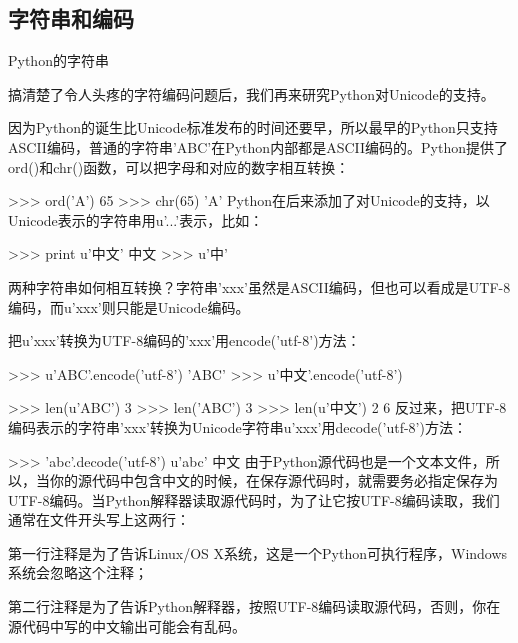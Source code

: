 \documentclass[10pt,a4paper]{ctexbook}
\begin{document}
\subsection{字符串和编码}

Python的字符串

搞清楚了令人头疼的字符编码问题后，我们再来研究Python对Unicode的支持。

因为Python的诞生比Unicode标准发布的时间还要早，所以最早的Python只支持ASCII编码，普通的字符串'ABC'在Python内部都是ASCII编码的。Python提供了ord()和chr()函数，可以把字母和对应的数字相互转换：

>>> ord('A')
65
>>> chr(65)
'A'
Python在后来添加了对Unicode的支持，以Unicode表示的字符串用u'...'表示，比如：

>>> print u'中文'
中文
>>> u'中'

两种字符串如何相互转换？字符串'xxx'虽然是ASCII编码，但也可以看成是UTF-8编码，而u'xxx'则只能是Unicode编码。

把u'xxx'转换为UTF-8编码的'xxx'用encode('utf-8')方法：

>>> u'ABC'.encode('utf-8')
'ABC'
>>> u'中文'.encode('utf-8')

>>> len(u'ABC')
3
>>> len('ABC')
3
>>> len(u'中文')
2
6
反过来，把UTF-8编码表示的字符串'xxx'转换为Unicode字符串u'xxx'用decode('utf-8')方法：

>>> 'abc'.decode('utf-8')
u'abc'
中文
由于Python源代码也是一个文本文件，所以，当你的源代码中包含中文的时候，在保存源代码时，就需要务必指定保存为UTF-8编码。当Python解释器读取源代码时，为了让它按UTF-8编码读取，我们通常在文件开头写上这两行：

第一行注释是为了告诉Linux/OS X系统，这是一个Python可执行程序，Windows系统会忽略这个注释；

第二行注释是为了告诉Python解释器，按照UTF-8编码读取源代码，否则，你在源代码中写的中文输出可能会有乱码。

\end{document}
